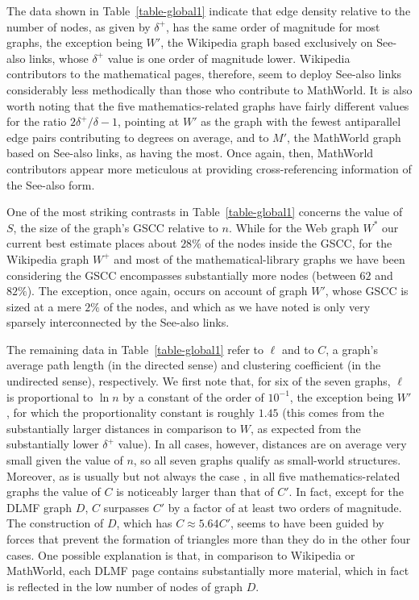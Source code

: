 \documentclass{article}
\begin{document}
\begin{table}
\centering
\caption{Global features: assortativity coefficients.}
\label{table-global2}

\end{table}

The data shown in Table~\ref{table-global1} indicate that edge density relative
to the number of nodes, as given by $\delta^+$, has the same order of magnitude
for most graphs, the exception being $W'$, the Wikipedia graph based exclusively
on See-also links, whose $\delta^+$ value is one order of magnitude lower.
Wikipedia contributors to the mathematical pages, therefore, seem to deploy
See-also links considerably less methodically than those who contribute to
MathWorld. It is also worth noting that the five mathematics-related graphs have
fairly different values for the ratio $2\delta^+/\delta-1$, pointing at $W'$ as
the graph with the fewest antiparallel edge pairs contributing to degrees on
average, and to $M'$, the MathWorld graph based on See-also links, as having the
most. Once again, then, MathWorld contributors appear more meticulous at
providing cross-referencing information of the See-also form.

One of the most striking contrasts in Table~\ref{table-global1} concerns the
value of $S$, the size of the graph's GSCC relative to $n$. While for the Web
graph $W^*$ our current best estimate places about $28\%$ of the nodes inside
the GSCC, for the Wikipedia graph $W^+$ and most of the mathematical-library
graphs we have been considering the GSCC encompasses substantially more nodes
(between $62$ and $82\%$). The exception, once again, occurs on account of graph
$W'$, whose GSCC is sized at a mere $2\%$ of the nodes, and which as we have
noted is only very sparsely interconnected by the See-also links.

The remaining data in Table~\ref{table-global1} refer to $\ell$ and to $C$, a
graph's average path length (in the directed sense) and clustering coefficient
(in the undirected sense), respectively. We first note that, for six of the
seven graphs, $\ell$ is proportional to $\ln n$ by a constant of the order of
$10^{-1}$, the exception being $W'$, for which the proportionality constant is
roughly $1.45$ (this comes from the substantially larger distances in comparison
to $W$, as expected from the substantially lower $\delta^+$ value). In all
cases, however, distances are on average very small given the value of $n$, so
all seven graphs qualify as small-world structures. Moreover, as is usually but
not always the case \cite{n10}, in all five mathematics-related graphs the value
of $C$ is noticeably larger than that of $C'$. In fact, except for the DLMF
graph $D$, $C$ surpasses $C'$ by a factor of at least two orders of magnitude.
The construction of $D$, which has $C\approx 5.64C'$, seems to have been guided
by forces that prevent the formation of triangles more than they do in the other
four cases. One possible explanation is that, in comparison to Wikipedia or
MathWorld, each DLMF page contains substantially more material, which in fact is
reflected in the low number of nodes of graph $D$.
\end{document}
